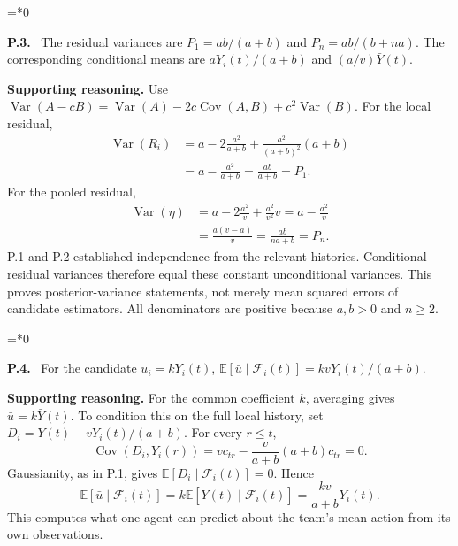 \documentclass[12pt,letterpaper]{article}
\newcommand{\E}{\mathbb E}
\newcommand{\Var}{\operatorname{Var}}
\newcommand{\Cov}{\operatorname{Cov}}
\newcommand{\F}{\mathcal F}
\newenvironment{proofstep}[2]{%
  \begin{list}{}{\leftmargin=\dimexpr 0.17in*#2\relax%
  \setlength{\rightmargin}{0pt}\setlength{\topsep}{5pt}\setlength{\parsep}{2pt}}%
  \item[]\textbf{\textcolor{ink}{#1.}}\ }{\end{list}}
\begin{document}
\begin{proofstep}{P.3}{0}
\label{step:P.3}
The residual variances are $P_1=ab/(a+b)$ and $P_n=ab/(b+na)$. The corresponding conditional means are $aY_i(t)/(a+b)$ and $(a/v)\bar Y(t)$.

\textbf{Supporting reasoning.}
Use $\Var(A-cB)=\Var(A)-2c\Cov(A,B)+c^2\Var(B)$. For the local residual,
\begin{align*}
\Var(R_i)&=a-2\frac{a^2}{a+b}+\frac{a^2}{(a+b)^2}(a+b)\\
&=a-\frac{a^2}{a+b}=\frac{ab}{a+b}=P_1.
\end{align*}
For the pooled residual,
\begin{align*}
\Var(\eta)&=a-2\frac{a^2}{v}+\frac{a^2}{v^2}v
=a-\frac{a^2}{v}\\
&=\frac{a(v-a)}v=\frac{ab}{na+b}=P_n.
\end{align*}
P.1 and P.2 established independence from the relevant histories. Conditional residual variances therefore equal these constant unconditional variances. This proves posterior-variance statements, not merely mean squared errors of candidate estimators. All denominators are positive because $a,b>0$ and $n\ge2$.
\par{}
\end{proofstep}

\begin{proofstep}{P.4}{0}
\label{step:P.4}
For the candidate $u_i=kY_i(t)$, $\E[\bar u\mid\mathcal F_i(t)]=kvY_i(t)/(a+b)$.

\textbf{Supporting reasoning.}
For the common coefficient $k$, averaging gives $\bar u=k\bar Y(t)$. To condition this on the full local history, set $D_i=\bar Y(t)-vY_i(t)/(a+b)$. For every $r\le t$,
\[
\Cov(D_i,Y_i(r))=v c_{tr}-\frac{v}{a+b}(a+b)c_{tr}=0.
\]
Gaussianity, as in P.1, gives $\E[D_i\mid\F_i(t)]=0$. Hence
\[
\E[\bar u\mid\F_i(t)]=k\E[\bar Y(t)\mid\F_i(t)]
=\frac{kv}{a+b}Y_i(t).
\]
This computes what one agent can predict about the team's mean action from its own observations.
\par{}
\end{proofstep}
\end{document}
